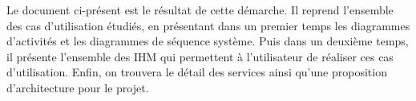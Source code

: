 Le document ci-présent est le résultat de cette démarche. Il reprend l'ensemble des cas d'utilisation étudiés, en présentant dans un premier temps les diagrammes d'activités et les diagrammes de séquence système. Puis dans un deuxième temps, il présente l'ensemble des IHM qui permettent à l'utilisateur de réaliser ces cas d'utilisation. Enfin, on trouvera le détail des services ainsi qu'une proposition d'architecture pour le projet.












